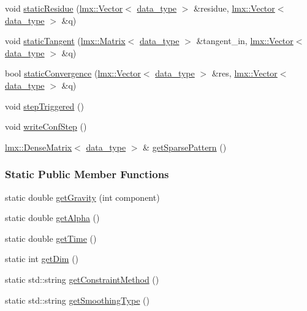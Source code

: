 \begin{DoxyCompactItemize}
void \hyperlink{classmknix_1_1_simulation_a1a65d519f553ac9d060c526ae508f152}{static\+Residue} (\hyperlink{classlmx_1_1_vector}{lmx\+::\+Vector}$<$ \hyperlink{namespacemknix_a16be4b246fbf2cceb141e3a179111020}{data\+\_\+type} $>$ \&residue, \hyperlink{classlmx_1_1_vector}{lmx\+::\+Vector}$<$ \hyperlink{namespacemknix_a16be4b246fbf2cceb141e3a179111020}{data\+\_\+type} $>$ \&q)
\item 
void \hyperlink{classmknix_1_1_simulation_a4ec8a62eed31911238142b362f60f43e}{static\+Tangent} (\hyperlink{classlmx_1_1_matrix}{lmx\+::\+Matrix}$<$ \hyperlink{namespacemknix_a16be4b246fbf2cceb141e3a179111020}{data\+\_\+type} $>$ \&tangent\+\_\+in, \hyperlink{classlmx_1_1_vector}{lmx\+::\+Vector}$<$ \hyperlink{namespacemknix_a16be4b246fbf2cceb141e3a179111020}{data\+\_\+type} $>$ \&q)
\item 
bool \hyperlink{classmknix_1_1_simulation_a3a9b6e1b8cf5a63ad6e3a7d2cce5d171}{static\+Convergence} (\hyperlink{classlmx_1_1_vector}{lmx\+::\+Vector}$<$ \hyperlink{namespacemknix_a16be4b246fbf2cceb141e3a179111020}{data\+\_\+type} $>$ \&res, \hyperlink{classlmx_1_1_vector}{lmx\+::\+Vector}$<$ \hyperlink{namespacemknix_a16be4b246fbf2cceb141e3a179111020}{data\+\_\+type} $>$ \&q)
\item 
void \hyperlink{classmknix_1_1_simulation_a9fd95351d7fe3ce2ba1991d6aae6a804}{step\+Triggered} ()
\item 
void \hyperlink{classmknix_1_1_simulation_a5d4227d2d500003664587afadecb1081}{write\+Conf\+Step} ()
\item 
\hyperlink{classlmx_1_1_dense_matrix}{lmx\+::\+Dense\+Matrix}$<$ \hyperlink{namespacemknix_a16be4b246fbf2cceb141e3a179111020}{data\+\_\+type} $>$ \& \hyperlink{classmknix_1_1_simulation_a7531cdc469c142e3b2d7f4e1738d65c9}{get\+Sparse\+Pattern} ()
\end{DoxyCompactItemize}
\subsubsection*{Static Public Member Functions}
\begin{DoxyCompactItemize}
\item 
static double \hyperlink{classmknix_1_1_simulation_ae1eca795584573082535d83d0705af29}{get\+Gravity} (int component)
\item 
static double \hyperlink{classmknix_1_1_simulation_ac2dcb63d177765da23658f6a552ad124}{get\+Alpha} ()
\item 
static double \hyperlink{classmknix_1_1_simulation_a916afeb12a5ac4c6abb5eaca2cc52e7b}{get\+Time} ()
\item 
static int \hyperlink{classmknix_1_1_simulation_adda4efbeb29fecf80bcd8552703bfed4}{get\+Dim} ()
\item 
static std\+::string \hyperlink{classmknix_1_1_simulation_a4f86c458f83403c391f10495dd15f9e9}{get\+Constraint\+Method} ()
\item 
static std\+::string \hyperlink{classmknix_1_1_simulation_a49263e8630678644836bbba466e6ab4b}{get\+Smoothing\+Type} ()
\end{DoxyCompactItemize}
